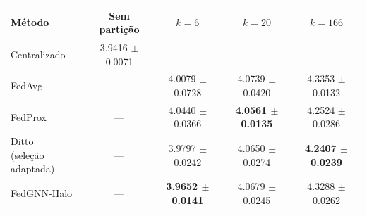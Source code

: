 
\begin{tabular}{lcccc}
\toprule
Método & Sem partição & $k=6$ & $k=20$ & $k=166$ \\
\midrule
Centralizado & \num{3.9416} $\pm$ \num{0.0071} & --- & --- & --- \\
\midrule
FedAvg & --- & \num{4.0079} $\pm$ \num{0.0728} & \num{4.0739} $\pm$ \num{0.0420} & \num{4.3353} $\pm$ \num{0.0132} \\
FedProx & --- & \num{4.0440} $\pm$ \num{0.0366} & \textbf{\boldmath\sisetup{mode=text,detect-weight=true}\num{4.0561} $\pm$ \num{0.0135}} & \num{4.2524} $\pm$ \num{0.0286} \\
\shortstack[l]{Ditto\\(seleção adaptada)} & --- & \num{3.9797} $\pm$ \num{0.0242} & \num{4.0650} $\pm$ \num{0.0274} & \textbf{\boldmath\sisetup{mode=text,detect-weight=true}\num{4.2407} $\pm$ \num{0.0239}} \\
FedGNN-Halo & --- & \textbf{\boldmath\sisetup{mode=text,detect-weight=true}\num{3.9652} $\pm$ \num{0.0141}} & \num{4.0679} $\pm$ \num{0.0245} & \num{4.3288} $\pm$ \num{0.0262} \\
\bottomrule
\end{tabular}
